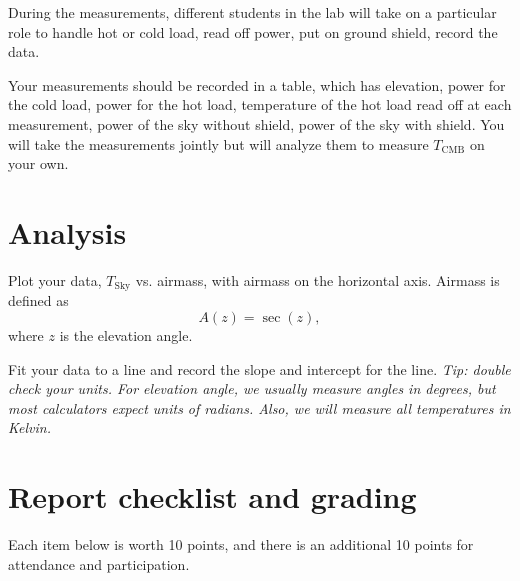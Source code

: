 During the measurements, different students in the lab will take on a particular role to handle hot or cold load, read off power, put on ground shield, record the data.
\begin{steps}
	\item\label{cmb:step:table} Your measurements should be recorded in a table, which has elevation, power for the cold load, power for the hot load, temperature of the hot load read off at each measurement, power of the sky without shield, power of the sky with shield. You will take the measurements jointly but will analyze them to measure $T_\textrm{CMB}$ on your own.
\end{steps}



\section{Analysis}

\begin{steps}
	\item\label{cmb:step:plot} Plot your data, $T_\textrm{Sky}$ vs. airmass, with airmass on the horizontal axis. Airmass is defined as
	\begin{equation}
	 A(z) = \sec(z),
	\end{equation}
	where $z$ is the elevation angle.
	
	\item\label{cmb:step:fit} Fit your data to a line and record the slope and intercept for the line. \textit{Tip: double check your units. For elevation angle, we usually measure angles in degrees, but most calculators expect units of radians. Also, we will measure all temperatures in Kelvin.}
\end{steps}

\section{Report checklist and grading}

Each item below is worth 10 points, and there is an additional 10 points for attendance and participation.

